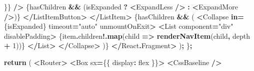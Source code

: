 \documentclass[
]{article}
\newenvironment{Shaded}{\begin{snugshade}}{\end{snugshade}}
\newcommand{\AttributeTok}[1]{\textcolor[rgb]{0.13,0.29,0.53}{#1}}
\newcommand{\ControlFlowTok}[1]{\textcolor[rgb]{0.13,0.29,0.53}{\textbf{#1}}}
\newcommand{\DecValTok}[1]{\textcolor[rgb]{0.00,0.00,0.81}{#1}}
\newcommand{\FunctionTok}[1]{\textcolor[rgb]{0.13,0.29,0.53}{\textbf{#1}}}
\newcommand{\KeywordTok}[1]{\textcolor[rgb]{0.13,0.29,0.53}{\textbf{#1}}}
\newcommand{\NormalTok}[1]{#1}
\newcommand{\OperatorTok}[1]{\textcolor[rgb]{0.81,0.36,0.00}{\textbf{#1}}}
\newcommand{\StringTok}[1]{\textcolor[rgb]{0.31,0.60,0.02}{#1}}
\begin{document}
\begin{Shaded}
\begin{Highlighting}[]
\NormalTok{              \}\}}
            \OperatorTok{/\textgreater{}}
\NormalTok{            \{hasChildren }\OperatorTok{\&\&}\NormalTok{ (isExpanded }\OperatorTok{?} \OperatorTok{\textless{}}\NormalTok{ExpandLess }\OperatorTok{/\textgreater{}} \OperatorTok{:} \OperatorTok{\textless{}}\NormalTok{ExpandMore }\OperatorTok{/\textgreater{}}\NormalTok{)\}}
          \OperatorTok{\textless{}/}\NormalTok{ListItemButton}\OperatorTok{\textgreater{}}
        \OperatorTok{\textless{}/}\NormalTok{ListItem}\OperatorTok{\textgreater{}}
\NormalTok{        \{hasChildren }\OperatorTok{\&\&}\NormalTok{ (}
          \OperatorTok{\textless{}}\NormalTok{Collapse }\KeywordTok{in}\OperatorTok{=}\NormalTok{\{isExpanded\} timeout}\OperatorTok{=}\StringTok{"auto"}\NormalTok{ unmountOnExit}\OperatorTok{\textgreater{}}
            \OperatorTok{\textless{}}\NormalTok{List component}\OperatorTok{=}\StringTok{"div"}\NormalTok{ disablePadding}\OperatorTok{\textgreater{}}
\NormalTok{              \{item}\OperatorTok{.}\AttributeTok{children}\OperatorTok{!.}\FunctionTok{map}\NormalTok{(child }\KeywordTok{=\textgreater{}} \FunctionTok{renderNavItem}\NormalTok{(child}\OperatorTok{,}\NormalTok{ depth }\OperatorTok{+} \DecValTok{1}\NormalTok{))\}}
            \OperatorTok{\textless{}/}\NormalTok{List}\OperatorTok{\textgreater{}}
          \OperatorTok{\textless{}/}\NormalTok{Collapse}\OperatorTok{\textgreater{}}
\NormalTok{        )\}}
      \OperatorTok{\textless{}/}\NormalTok{React}\OperatorTok{.}\AttributeTok{Fragment}\OperatorTok{\textgreater{}}
\NormalTok{    )}\OperatorTok{;}
\NormalTok{  \}}\OperatorTok{;}

  \ControlFlowTok{return}\NormalTok{ (}
    \OperatorTok{\textless{}}\NormalTok{Router}\OperatorTok{\textgreater{}}
      \OperatorTok{\textless{}}\NormalTok{Box sx}\OperatorTok{=}\NormalTok{\{\{ display}\OperatorTok{:} \StringTok{\textquotesingle{}flex\textquotesingle{}}\NormalTok{ \}\}}\OperatorTok{\textgreater{}}
        \OperatorTok{\textless{}}\NormalTok{CssBaseline }\OperatorTok{/\textgreater{}}


\end{Highlighting}
\end{Shaded}
\end{document}
